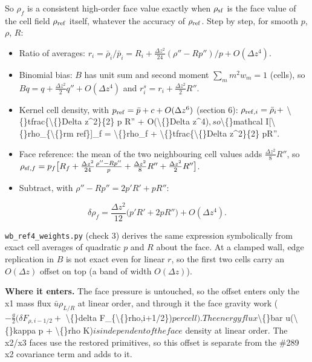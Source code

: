 \documentclass[11pt,a4paper]{article}
\begin{document}
So $\rho_f$ is a consistent high-order face value exactly when $\rho_{\rm sf}$ is the face value of the cell
field $\rho_{\rm ref}$ itself, whatever the accuracy of $\rho_{\rm ref}$. Step by step, for smooth $p$, $\rho$, $R$:

\begin{itemize}
\item Ratio of averages: $r_i = \bar\rho_i/\bar p_i = R_i + \tfrac{\Delta z^2}{24}(\rho'' - R p'')/p + O(\Delta z^4)$.
\item Binomial bias: $B$ has unit sum and second moment $\sum_m m^2 w_m = 1$ (cells), so
  $B q = q + \tfrac{\Delta z^2}{2} q'' + O(\Delta z^4)$ and $r^s_i = r_i + \tfrac{\Delta z^2}{2}R''$.
\item Kernel cell density, with $p_{\rm ref} = \bar p + c + O(\Delta z^6)$ (section 6): $\rho_{{\rm ref},i} = \bar\rho_i +$
  \textbackslash\{\}tfrac\{\textbackslash\{\}Delta z\textasciicircum{}2\}\{2\} p R'' + O(\textbackslash\{\}Delta z\textasciicircum{}4)$, so $\textbackslash\{\}mathcal I[\textbackslash\{\}rho\_\{\textbackslash\{\}rm ref\}]\_f = \textbackslash\{\}rho\_f + \textbackslash\{\}tfrac\{\textbackslash\{\}Delta z\textasciicircum{}2\}\{2\} pR''$.$
\item Face reference: the mean of the two neighbouring cell values adds $\tfrac{\Delta z^2}{8}R''$, so
  $\rho_{{\rm sf},f} = p_f\big[R_f + \tfrac{\Delta z^2}{24}\tfrac{\rho'' - Rp''}{p} + \tfrac{\Delta z^2}{8}R'' + \tfrac{\Delta z^2}{2}R''\big]$.
\item Subtract, with $\rho'' - Rp'' = 2p'R' + pR''$:
\end{itemize}

\begin{equation*}
\delta\rho_f = \frac{\Delta z^2}{12}\big(p'R' + 2pR''\big) + O(\Delta z^4).
\end{equation*}

\texttt{wb\_ref4\_weights.py} (check 3) derives the same expression symbolically from exact cell averages of
quadratic $p$ and $R$ about the face. At a clamped wall, edge replication in $B$ is not exact even for linear
$r$, so the first two cells carry an $O(\Delta z)$ offset on top (a band of width $O(\Delta z)$).

\textbf{Where it enters.} The face pressure is untouched, so the offset enters only the x1 mass flux
$\bar u\rho_{L/R}$ at linear order, and through it the face gravity work ($-\tfrac g2(\delta F_{\rho,i-1/2} +$
\textbackslash\{\}delta F\_\{\textbackslash\{\}rho,i+1/2\})$ per cell). The energy flux $\textbackslash\{\}bar u(\textbackslash\{\}kappa p + \textbackslash\{\}rho K)$ is independent of the face$
density at linear order. The x2/x3 faces use the restored primitives, so this offset is separate from the
\#289 x2 covariance term and adds to it.
\end{document}
